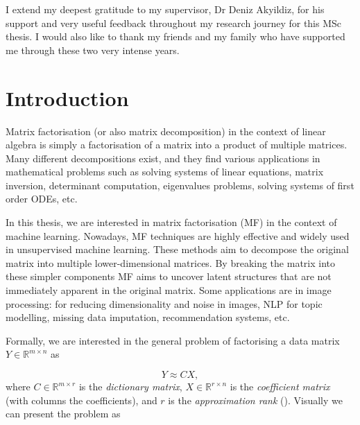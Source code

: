\documentclass{mldsmsc}
\begin{document}
\begin{acknowledgements}

I extend my deepest gratitude to my supervisor, Dr Deniz Akyildiz, for his support and very useful feedback throughout my research journey for this MSc thesis. I would also like to thank my friends and my family who have supported me through these two very intense years. 

\end{acknowledgements}


\tableofcontents

\mainmatter


\chapter{Introduction}

Matrix factorisation (or also matrix decomposition) in the context of linear algebra is simply a factorisation of a matrix into a product of multiple matrices. Many different decompositions exist, and they find various applications in mathematical problems such as solving systems of linear equations, matrix inversion, determinant computation, eigenvalues problems, solving systems of first order ODEs, etc. \newline

\noindent In this thesis, we are interested in matrix factorisation (MF) in the context of machine learning. Nowadays, MF techniques are highly effective and widely used in unsupervised machine learning. These methods aim to decompose the original matrix into multiple lower-dimensional matrices. By breaking the matrix into these simpler components MF aims to uncover latent structures that are not immediately apparent in the original matrix. Some applications are in image processing: for reducing dimensionality and noise in images, NLP for topic modelling, missing data imputation, recommendation systems, etc. \newline

\noindent Formally, we are interested in the general problem of factorising a data matrix $Y \in \mathbb{R}^{m \times n}$ as

\begin{equation}
Y \approx CX,
\end{equation} \newline
\noindent where $C \in \mathbb{R}^{m \times r}$ is the \textit{dictionary matrix}, $X \in \mathbb{R}^{r \times n}$ is the \textit{coefficient matrix} (with columns the coefficients), and $r$ is the \textit{approximation rank} (\cite{cite-key}). Visually we can present the problem as
\end{document}
